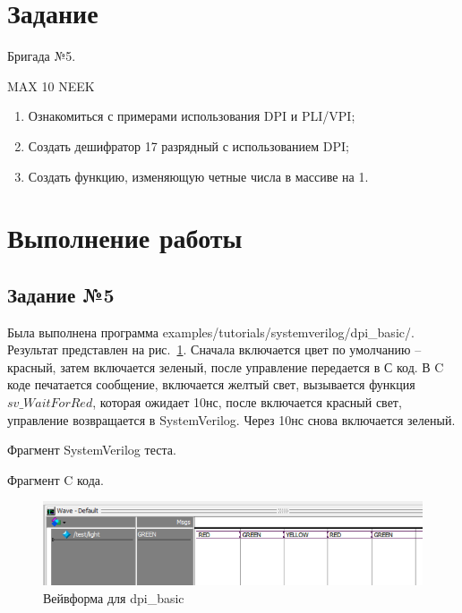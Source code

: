 \documentclass[a4paper,14pt]{article}
\begin{document}
    
    \tableofcontents
    \pagebreak


    \section{Задание}

    Бригада №5.

    MAX 10 NEEK

    \begin{enumerate}
        \item Ознакомиться с примерами использования DPI и PLI/VPI;
        \item Создать дешифратор 17 разрядный с использованием DPI;
        \item Создать функцию, изменяющую четные числа в массиве на 1.
    \end{enumerate}


    \section{Выполнение работы}

    \subsection{Задание №5}

    Была выполнена программа examples/tutorials/systemverilog/dpi\_basic/.
    Результат представлен на рис.~\ref{fig:05_wave}.
    Сначала включается цвет по умолчанию -- красный, затем включается зеленый, после управление передается в С код.
    В C коде печатается сообщение, включается желтый свет, вызывается функция $sv\_WaitForRed$, которая ожидает 10нс,
    после включается красный свет, управление возвращается в SystemVerilog.
    Через 10нс снова включается зеленый.

    Фрагмент SystemVerilog теста.
    {\small {}}

    Фрагмент C кода.
    {\small {}}

    \begin{figure}[H]
        \centering
        \includegraphics[width=\linewidth]{images/05_wave}
        \caption{Вейвформа для dpi\_basic}
        \label{fig:05_wave}
    \end{figure}
\end{document}
